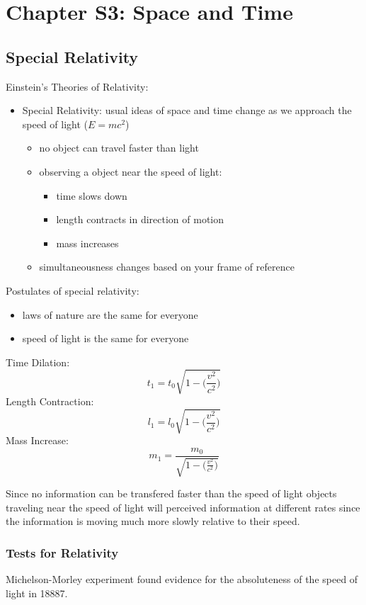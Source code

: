 \section{Chapter S3: Space and Time}

\subsection{Special Relativity}

Einstein's Theories of Relativity:
\begin{itemize}
\item Special Relativity: usual ideas of space and time change as we approach the speed of light ($E = mc^2$)
\begin{itemize}
\item no object can travel faster than light
\item observing a object near the speed of light:
\begin{itemize}
\item time slows down
\item length contracts in direction of motion
\item mass increases
\end{itemize}
\item simultaneousness changes based on your frame of reference
\end{itemize}
\end{itemize}

Postulates of special relativity:
\begin{itemize}
\item laws of nature are the same for everyone
\item speed of light is the same for everyone
\end{itemize}

Time Dilation: \[ t_1 = t_0\sqrt{1-\bigg(\frac{v^2}{c^2}\bigg)} \]
Length Contraction: \[ l_1 = l_0\sqrt{1-\bigg(\frac{v^2}{c^2}\bigg)} \]
Mass Increase: \[ m_1 = \frac{m_0}{\sqrt{1-\bigg(\frac{v^2}{c^2}\bigg)}} \]

Since no information can be transfered faster than the speed of light objects traveling near the speed of light will perceived information at different rates since the information is moving much more slowly relative to their speed.

\subsubsection{Tests for Relativity}
Michelson-Morley experiment found evidence for the absoluteness of the speed of light in 18887.


